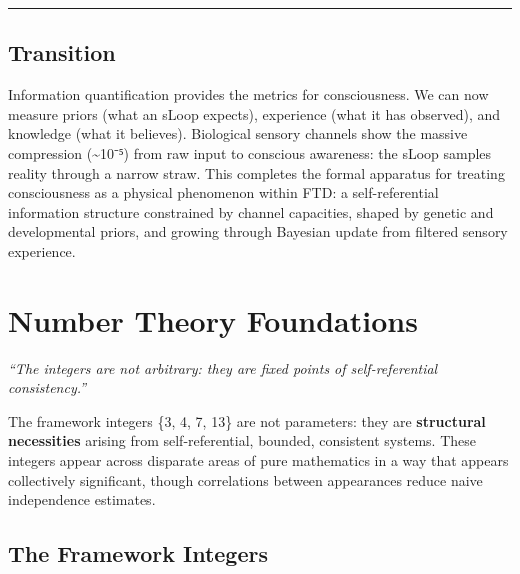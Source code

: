 \documentclass[
  11pt,
  letterpaper,
  twoside,
  openany]{book}
\makeatletter
\let\orig@section\section
\renewcommand{\section}{\needspace{8\baselineskip}\orig@section}
\makeatother
\begin{document}
\begin{center}\rule{0.5\linewidth}{0.5pt}\end{center}

\section{Transition}\label{transition-1}

Information quantification provides the metrics for consciousness. We
can now measure priors (what an sLoop expects), experience (what it has
observed), and knowledge (what it believes). Biological sensory channels
show the massive compression (\textasciitilde10⁻⁵) from raw input to
conscious awareness: the sLoop samples reality through a narrow straw.
This completes the formal apparatus for treating consciousness as a
physical phenomenon within FTD: a self-referential information structure
constrained by channel capacities, shaped by genetic and developmental
priors, and growing through Bayesian update from filtered sensory
experience.

\chapter{Number Theory Foundations}\label{sec-number-theory}

\emph{``The integers are not arbitrary: they are fixed points of
self-referential consistency.''}

\begin{tcolorbox}[enhanced jigsaw, colbacktitle=quarto-callout-important-color!10!white, titlerule=0mm, bottomtitle=1mm, bottomrule=.15mm, colback=white, arc=.35mm, breakable, toprule=.15mm, title=\textcolor{quarto-callout-important-color}{\faExclamation}\hspace{0.5em}{Deep Mathematical Structure}, rightrule=.15mm, coltitle=black, leftrule=.75mm, colframe=quarto-callout-important-color-frame, toptitle=1mm, opacityback=0, opacitybacktitle=0.6, left=2mm]

The framework integers \{3, 4, 7, 13\} are not parameters: they are
\textbf{structural necessities} arising from self-referential, bounded,
consistent systems. These integers appear across disparate areas of pure
mathematics in a way that appears collectively significant, though
correlations between appearances reduce naive independence estimates.

\end{tcolorbox}

\section{The Framework Integers}\label{the-framework-integers}
\end{document}
